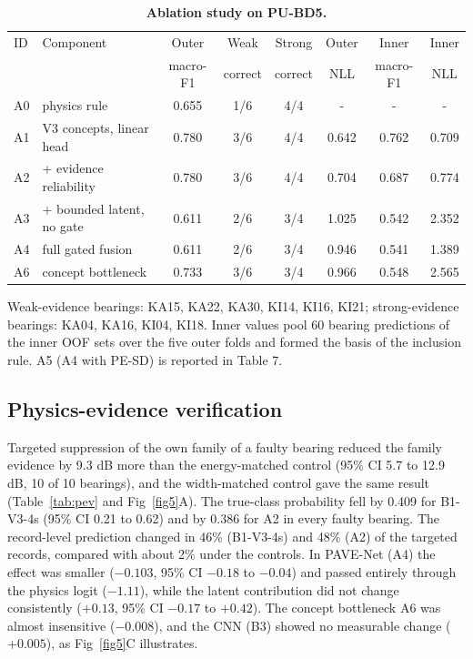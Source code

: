 \documentclass[10pt,letterpaper]{article}
\begin{document}
\begin{table}[!ht]
\centering
\caption{\textbf{Ablation study on PU-BD5.}}
{\footnotesize
\setlength{\tabcolsep}{4pt}
\renewcommand{\arraystretch}{1.25}
\begin{tabular}{llcccccc}
\hline
ID & Component & Outer & Weak & Strong & Outer & Inner & Inner \\
 & & macro-F1 & correct & correct & NLL & macro-F1 & NLL \\
\hline
A0 & physics rule & 0.655 & 1/6 & 4/4 & - & - & - \\
A1 & V3 concepts, linear head & 0.780 & 3/6 & 4/4 & 0.642 & 0.762 & 0.709 \\
A2 & + evidence reliability & 0.780 & 3/6 & 4/4 & 0.704 & 0.687 & 0.774 \\
A3 & + bounded latent, no gate & 0.611 & 2/6 & 3/4 & 1.025 & 0.542 & 2.352 \\
A4 & full gated fusion & 0.611 & 2/6 & 3/4 & 0.946 & 0.541 & 1.389 \\
A6 & concept bottleneck & 0.733 & 3/6 & 3/4 & 0.966 & 0.548 & 2.565 \\
\hline
\end{tabular}}
\begin{flushleft} Weak-evidence bearings: KA15, KA22, KA30, KI14, KI16, KI21; strong-evidence bearings: KA04, KA16, KI04, KI18. Inner values pool 60 bearing predictions of the inner OOF sets over the five outer folds and formed the basis of the inclusion rule. A5 (A4 with PE-SD) is reported in Table 7. \end{flushleft}
\label{tab:ablation}
\end{table}

\subsection*{Physics-evidence verification}
Targeted suppression of the own family of a faulty bearing reduced the family evidence by 9.3 dB more than the energy-matched control (95\% CI 5.7 to 12.9 dB, 10 of 10 bearings), and the width-matched control gave the same result (Table~\ref{tab:pev} and Fig~\ref{fig5}A). The true-class probability fell by 0.409 for B1-V3-4s (95\% CI 0.21 to 0.62) and by 0.386 for A2 in every faulty bearing. The record-level prediction changed in 46\% (B1-V3-4s) and 48\% (A2) of the targeted records, compared with about 2\% under the controls. In PAVE-Net (A4) the effect was smaller ($-0.103$, 95\% CI $-0.18$ to $-0.04$) and passed entirely through the physics logit ($-1.11$), while the latent contribution did not change consistently ($+0.13$, 95\% CI $-0.17$ to $+0.42$). The concept bottleneck A6 was almost insensitive ($-0.008$), and the CNN (B3) showed no measurable change ($+0.005$), as Fig~\ref{fig5}C illustrates.
\end{document}
